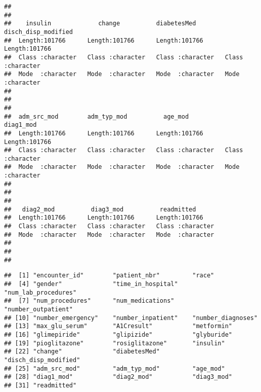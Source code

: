\documentclass[
]{article}
\begin{document}
\begin{verbatim}
##                                                                             
##                                                                             
##    insulin             change          diabetesMed        disch_disp_modified
##  Length:101766      Length:101766      Length:101766      Length:101766      
##  Class :character   Class :character   Class :character   Class :character   
##  Mode  :character   Mode  :character   Mode  :character   Mode  :character   
##                                                                              
##                                                                              
##                                                                              
##  adm_src_mod        adm_typ_mod          age_mod           diag1_mod        
##  Length:101766      Length:101766      Length:101766      Length:101766     
##  Class :character   Class :character   Class :character   Class :character  
##  Mode  :character   Mode  :character   Mode  :character   Mode  :character  
##                                                                             
##                                                                             
##                                                                             
##   diag2_mod          diag3_mod          readmitted       
##  Length:101766      Length:101766      Length:101766     
##  Class :character   Class :character   Class :character  
##  Mode  :character   Mode  :character   Mode  :character  
##                                                          
##                                                          
## 
\end{verbatim}

\begin{verbatim}
##  [1] "encounter_id"        "patient_nbr"         "race"               
##  [4] "gender"              "time_in_hospital"    "num_lab_procedures" 
##  [7] "num_procedures"      "num_medications"     "number_outpatient"  
## [10] "number_emergency"    "number_inpatient"    "number_diagnoses"   
## [13] "max_glu_serum"       "A1Cresult"           "metformin"          
## [16] "glimepiride"         "glipizide"           "glyburide"          
## [19] "pioglitazone"        "rosiglitazone"       "insulin"            
## [22] "change"              "diabetesMed"         "disch_disp_modified"
## [25] "adm_src_mod"         "adm_typ_mod"         "age_mod"            
## [28] "diag1_mod"           "diag2_mod"           "diag3_mod"          
## [31] "readmitted"
\end{verbatim}
\end{document}
